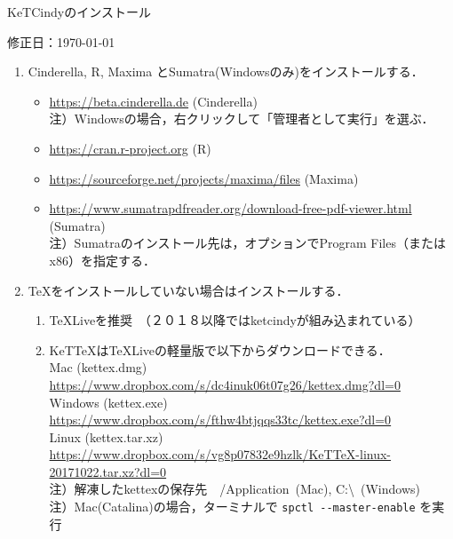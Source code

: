 \documentclass{ujarticle}
\begin{document}
\begin{center}
KeTCindyのインストール
\end{center}

\vspace{-5mm}

\hfill 修正日：\today

\begin{enumerate}[\bf\large 1.]
\item Cinderella, R, Maxima とSumatra(Windowsのみ)をインストールする．\vspace{-2mm}

 \begin{itemize}
 \item \url{https://beta.cinderella.de}  (Cinderella)\\
\hspace*{6mm}注）Windowsの場合，右クリックして「管理者として実行」を選ぶ．
 \item \url{https://cran.r-project.org}   (R)
 \item \url{https://sourceforge.net/projects/maxima/files}  (Maxima)
 \item \url{https://www.sumatrapdfreader.org/download-free-pdf-viewer.html} (Sumatra)\\
\hspace*{6mm}注）Sumatraのインストール先は，オプションでProgram Files（またはx86）を指定する．

 \end{itemize}
\item TeXをインストールしていない場合はインストールする．\vspace{-2mm}
 \begin{enumerate}[(1)]
 \item TeXLiveを推奨　（２０１８以降ではketcindyが組み込まれている）
 \item KeTTeXはTeXLiveの軽量版で以下からダウンロードできる．\\
    \hspace*{5mm}Mac (kettex.dmg)\\
    \hspace*{10mm}\url{https://www.dropbox.com/s/dc4inuk06t07g26/kettex.dmg?dl=0}\\
    \hspace*{5mm}Windows (kettex.exe)\\
    \hspace*{10mm}\url{https://www.dropbox.com/s/fthw4btjqqs33tc/kettex.exe?dl=0}\\
    \hspace*{5mm}Linux (kettex.tar.xz)\\
    \hspace*{10mm}\url{https://www.dropbox.com/s/vg8p07832e9hzlk/KeTTeX-linux-20171022.tar.xz?dl=0}\\
    \hspace*{5mm}注）解凍したkettexの保存先　/Application\ (Mac), C:\textbackslash\ (Windows)\\
    \hspace*{5mm}注）Mac(Catalina)の場合，ターミナルで \verb|spctl --master-enable| を実行


\end{enumerate}
\end{enumerate}
\end{document}
